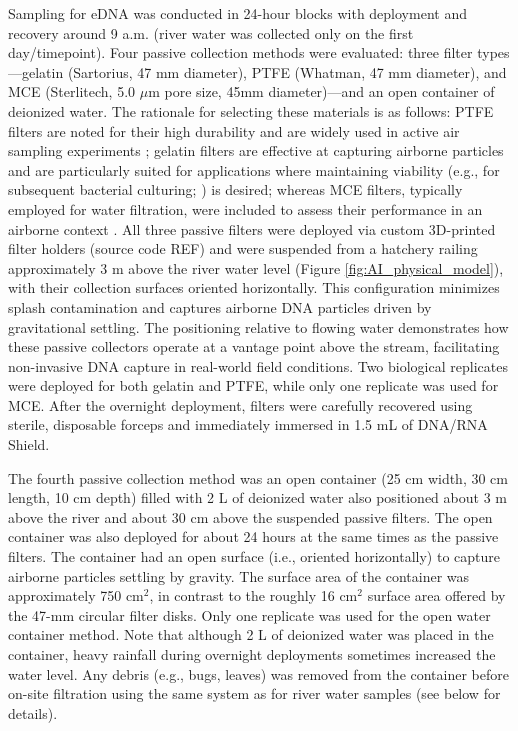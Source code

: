 \documentclass{article}
\begin{document}
Sampling for eDNA was conducted in 24-hour blocks with deployment and recovery around 9 a.m. (river water was collected only on the first day/timepoint). Four passive collection methods were evaluated: three filter types—gelatin (Sartorius, 47 mm diameter), PTFE (Whatman, 47 mm diameter), and MCE (Sterlitech, 5.0 $\mu$m pore size, 45mm diameter)—and an open container of deionized water. The rationale for selecting these materials is as follows: PTFE filters are noted for their high durability and are widely used in active air sampling experiments \cite{harnpicharnchai2023}; gelatin filters are effective at capturing airborne particles and are particularly suited for applications where maintaining viability (e.g., for subsequent bacterial culturing; \cite{wu2010}) is desired; whereas MCE filters, typically employed for water filtration, were included to assess their performance in an airborne context \cite{allan2023}. All three passive filters were deployed via custom 3D-printed filter holders (source code REF) and were suspended from a hatchery railing approximately 3 m above the river water level (Figure \ref{fig:AI_physical_model}), with their collection surfaces oriented horizontally. This configuration minimizes splash contamination and captures airborne DNA particles driven by gravitational settling. The positioning relative to flowing water demonstrates how these passive collectors operate at a vantage point above the stream, facilitating non-invasive DNA capture in real-world field conditions. Two biological replicates were deployed for both gelatin and PTFE, while only one replicate was used for MCE. After the overnight deployment, filters were carefully recovered using sterile, disposable forceps and immediately immersed in 1.5 mL of DNA/RNA Shield. 

The fourth passive collection method was an open container (25 cm width, 30 cm length, 10 cm depth) filled with 2 L of deionized water \cite{klepke2022} also positioned about 3 m above the river and about 30 cm above the suspended passive filters. The open container was also deployed for about 24 hours at the same times as the passive filters. The container had an open surface (i.e., oriented horizontally) to capture airborne particles settling by gravity. The surface area of the container was approximately 750 cm$^2$, in contrast to the roughly 16 cm$^2$ surface area offered by the 47-mm circular filter disks. Only one replicate was used for the open water container method. Note that although 2 L of deionized water was placed in the container, heavy rainfall during overnight deployments sometimes increased the water level. Any debris (e.g., bugs, leaves) was removed from the container before on-site filtration using the same system as for river water samples (see below for details).
\end{document}

